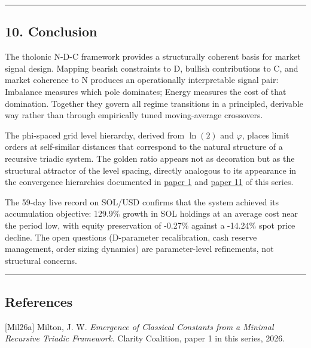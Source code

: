 \documentclass[
  11pt,
  letterpaper,
]{article}
\begin{document}
\begin{center}\rule{0.5\linewidth}{0.5pt}\end{center}

\subsection{10. Conclusion}\label{conclusion}

The tholonic N-D-C framework provides a structurally coherent basis for
market signal design. Mapping bearish constraints to D, bullish
contributions to C, and market coherence to N produces an operationally
interpretable signal pair: Imbalance measures which pole dominates;
Energy measures the cost of that domination. Together they govern all
regime transitions in a principled, derivable way rather than through
empirically tuned moving-average crossovers.

The phi-spaced grid level hierarchy, derived from \(\ln(2)\) and
\(\varphi\), places limit orders at self-similar distances that
correspond to the natural structure of a recursive triadic system. The
golden ratio appears not as decoration but as the structural attractor
of the level spacing, directly analogous to its appearance in the
convergence hierarchies documented in
\href{https://github.com/baardev/truevalue/blob/main/docnav/Research/papers/1_recursive-tholonic-five-constants/1_recursive-tholonic-five-constants.pdf}{paper
1} and
\href{https://github.com/baardev/truevalue/blob/main/docnav/Research/papers/11_tholonic-seed-space-power-of-two-hierarchy/11_tholonic-seed-space-power-of-two-hierarchy.pdf}{paper
11} of this series.

The 59-day live record on SOL/USD confirms that the system achieved its
accumulation objective: 129.9\% growth in SOL holdings at an average
cost near the period low, with equity preservation of -0.27\% against a
-14.24\% spot price decline. The open questions (D-parameter
recalibration, cash reserve management, order sizing dynamics) are
parameter-level refinements, not structural concerns.

\begin{center}\rule{0.5\linewidth}{0.5pt}\end{center}

\subsection{References}\label{references}

{[}Mil26a{]} Milton, J. W. \emph{Emergence of Classical Constants from a
Minimal Recursive Triadic Framework.} Clarity Coalition, paper 1 in this
series, 2026.
\end{document}
